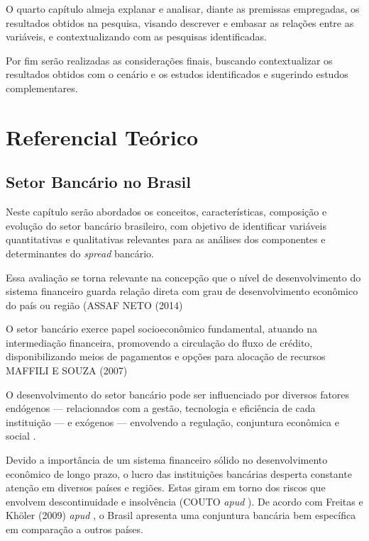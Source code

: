 \documentclass[12pt,openright,oneside,a4paper,chapter=TITLE,section=TITLE,subsection=TITLE,english,french,spanish,portugues,sumario=tradicional]{04-class-files/abntex2}
\begin{document}
O quarto capítulo almeja explanar e analisar, diante as premissas empregadas, os resultados obtidos na pesquisa, visando descrever e embasar as relações entre as variáveis, e contextualizando com as pesquisas identificadas.

Por fim serão realizadas as considerações finais, buscando contextualizar os resultados obtidos com o cenário e os estudos identificados e sugerindo estudos complementares.

\textual
\pagestyle{simple}

\chapter{Referencial Teórico}

\section{Setor Bancário no Brasil}

Neste capítulo serão abordados os conceitos, características, composição e
evolução do setor bancário brasileiro, com objetivo de identificar variáveis
quantitativas e qualitativas relevantes para as análises dos componentes e
determinantes do \emph{spread} bancário.

Essa avaliação se torna relevante na concepção que o nível de desenvolvimento
do sistema financeiro guarda relação direta com grau de desenvolvimento
econômico do país ou região (ASSAF NETO (2014)

O setor bancário exerce papel socioeconômico fundamental, atuando na
intermediação financeira, promovendo a circulação do fluxo de crédito,
disponibilizando meios de pagamentos e opções para alocação de recursos MAFFILI
E SOUZA (2007)

O desenvolvimento do setor bancário pode ser influenciado por diversos fatores
endógenos --- relacionados com a gestão, tecnologia e eficiência de cada
instituição --- e exógenos --- envolvendo a regulação, conjuntura econômica e
social \cite{rover:2011}.

Devido a importância de um sistema financeiro sólido no desenvolvimento
econômico de longo prazo, o lucro das instituições bancárias desperta constante
atenção em diversos países e regiões. Estas giram em torno dos riscos que
envolvem descontinuidade e insolvência (COUTO \emph{apud} \cite{dantas:2012}). De
acordo com Freitas e Khöler (2009) \emph{apud} \textcite{dantas:2012}, o Brasil
apresenta uma conjuntura bancária bem específica em comparação a outros países.
\end{document}
